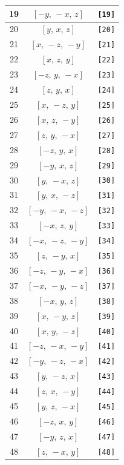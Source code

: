 \documentclass[fleqn,8pt]{jsarticle}
\begin{document}
\begin{longtable}{ccc}
19 & $\left[ - y,\, - x,\, z \right]$ & {\tt [19]} \\ \hline
20 & $\left[ y,\, x,\, z \right]$ & {\tt [20]} \\ \hline
21 & $\left[ x,\, - z,\, - y \right]$ & {\tt [21]} \\ \hline
22 & $\left[ x,\, z,\, y \right]$ & {\tt [22]} \\ \hline
23 & $\left[ - z,\, y,\, - x \right]$ & {\tt [23]} \\ \hline
24 & $\left[ z,\, y,\, x \right]$ & {\tt [24]} \\ \hline
25 & $\left[ x,\, - z,\, y \right]$ & {\tt [25]} \\ \hline
26 & $\left[ x,\, z,\, - y \right]$ & {\tt [26]} \\ \hline
27 & $\left[ z,\, y,\, - x \right]$ & {\tt [27]} \\ \hline
28 & $\left[ - z,\, y,\, x \right]$ & {\tt [28]} \\ \hline
29 & $\left[ - y,\, x,\, z \right]$ & {\tt [29]} \\ \hline
30 & $\left[ y,\, - x,\, z \right]$ & {\tt [30]} \\ \hline
31 & $\left[ y,\, x,\, - z \right]$ & {\tt [31]} \\ \hline
32 & $\left[ - y,\, - x,\, - z \right]$ & {\tt [32]} \\ \hline
33 & $\left[ - x,\, z,\, y \right]$ & {\tt [33]} \\ \hline
34 & $\left[ - x,\, - z,\, - y \right]$ & {\tt [34]} \\ \hline
35 & $\left[ z,\, - y,\, x \right]$ & {\tt [35]} \\ \hline
36 & $\left[ - z,\, - y,\, - x \right]$ & {\tt [36]} \\ \hline
37 & $\left[ - x,\, - y,\, - z \right]$ & {\tt [37]} \\ \hline
38 & $\left[ - x,\, y,\, z \right]$ & {\tt [38]} \\ \hline
39 & $\left[ x,\, - y,\, z \right]$ & {\tt [39]} \\ \hline
40 & $\left[ x,\, y,\, - z \right]$ & {\tt [40]} \\ \hline
41 & $\left[ - z,\, - x,\, - y \right]$ & {\tt [41]} \\ \hline
42 & $\left[ - y,\, - z,\, - x \right]$ & {\tt [42]} \\ \hline
43 & $\left[ y,\, - z,\, x \right]$ & {\tt [43]} \\ \hline
44 & $\left[ z,\, x,\, - y \right]$ & {\tt [44]} \\ \hline
45 & $\left[ y,\, z,\, - x \right]$ & {\tt [45]} \\ \hline
46 & $\left[ - z,\, x,\, y \right]$ & {\tt [46]} \\ \hline
47 & $\left[ - y,\, z,\, x \right]$ & {\tt [47]} \\ \hline
48 & $\left[ z,\, - x,\, y \right]$ & {\tt [48]} \\
\end{longtable}
\end{document}
